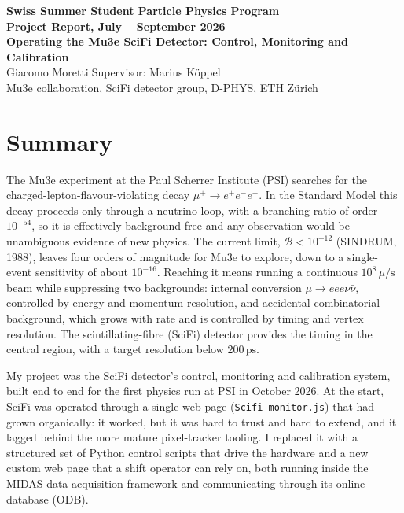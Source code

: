 \documentclass[12pt,a4paper]{article}
\newcommand{\studentname}{Giacomo Moretti}
\newcommand{\supervisorname}{Marius K\"oppel}
\newcommand{\hostgroup}{Mu3e collaboration, SciFi detector group}
\newcommand{\hostinstitute}{D-PHYS, ETH Z\"urich}
\newcommand{\projecttitle}{Operating the Mu3e SciFi Detector: Control, Monitoring and Calibration}
\begin{document}
\begin{center}
	{\large\bfseries Swiss Summer Student Particle Physics Program}\\[4pt]
	{\bfseries Project Report, July -- September 2026}\\[6pt]
	{\bfseries \projecttitle}\\[4pt]
	{\normalsize \studentname \quad$\vert$\quad Supervisor: \supervisorname}\\[1pt]
	{\normalsize \hostgroup, \hostinstitute}\\[3pt]
\end{center}
\vspace{0.6em}

\section{Summary}

The Mu3e experiment at the Paul Scherrer Institute (PSI) searches for the
charged-lepton-flavour-violating decay $\mu^+ \to e^+e^-e^+$. In the Standard
Model this decay proceeds only through a neutrino loop, with a branching ratio
of order $10^{-54}$, so it is effectively background-free and any observation
would be unambiguous evidence of new physics. The current limit,
$\mathcal{B} < 10^{-12}$ (SINDRUM, 1988), leaves four orders of magnitude for
Mu3e to explore, down to a single-event sensitivity of about $10^{-16}$.
Reaching it means running a continuous $10^{8}\,\mu/\mathrm{s}$ beam while
suppressing two backgrounds: internal conversion $\mu \to eee\nu\bar\nu$,
controlled by energy and momentum resolution, and accidental combinatorial
background, which grows with rate and is controlled by timing and vertex
resolution. The scintillating-fibre (SciFi) detector provides the timing in the
central region, with a target resolution below $200\,\mathrm{ps}$.

My project was the SciFi detector's control, monitoring and calibration system,
built end to end for the first physics run at PSI in October 2026. At the start,
SciFi was operated through a single web page (\texttt{Scifi-monitor.js}) that
had grown organically: it worked, but it was hard to trust and hard to extend,
and it lagged behind the more mature pixel-tracker tooling. I replaced it with a
structured set of Python control scripts that drive the hardware and a new
custom web page that a shift operator can rely on, both running inside the MIDAS
data-acquisition framework and communicating through its online database (ODB).
\end{document}
